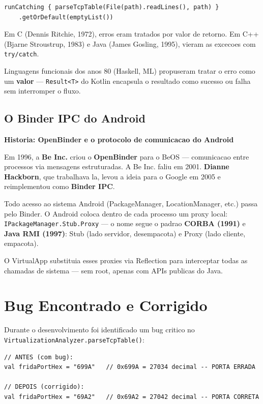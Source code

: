 \documentclass[12pt,a4paper]{article}
\begin{document}
\begin{lstlisting}
runCatching { parseTcpTable(File(path).readLines(), path) }
    .getOrDefault(emptyList())
\end{lstlisting}

Em C (Dennis Ritchie, 1972), erros eram tratados por valor de retorno.
Em C++ (Bjarne Stroustrup, 1983) e Java (James Gosling, 1995), vieram
as excecoes com \texttt{try/catch}.

Linguagens funcionais dos anos 80 (Haskell, ML) propuseram tratar o erro
como um \textbf{valor} --- \texttt{Result<T>} do Kotlin encapsula o resultado
como sucesso ou falha sem interromper o fluxo.

\subsection{O Binder IPC do Android}

\begin{historybox}
\textbf{Historia: OpenBinder e o protocolo de comunicacao do Android}

Em 1996, a \textbf{Be Inc.} criou o \textbf{OpenBinder} para o BeOS ---
comunicacao entre processos via mensagens estruturadas.
A Be Inc. faliu em 2001. \textbf{Dianne Hackborn}, que trabalhava la,
levou a ideia para o Google em 2005 e reimplementou como \textbf{Binder IPC}.

Todo acesso ao sistema Android (PackageManager, LocationManager, etc.)
passa pelo Binder. O Android coloca dentro de cada processo um proxy local:
\texttt{IPackageManager.Stub.Proxy} --- o nome segue o padrao \textbf{CORBA (1991)}
e \textbf{Java RMI (1997)}: Stub (lado servidor, desempacota) e Proxy
(lado cliente, empacota).

O VirtualApp substituia esses proxies via Reflection para interceptar
todas as chamadas de sistema --- sem root, apenas com APIs publicas do Java.
\end{historybox}

\newpage

\section{Bug Encontrado e Corrigido}

Durante o desenvolvimento foi identificado um bug critico no
\texttt{VirtualizationAnalyzer.parseTcpTable()}:

\begin{lstlisting}
// ANTES (com bug):
val fridaPortHex = "699A"   // 0x699A = 27034 decimal -- PORTA ERRADA

// DEPOIS (corrigido):
val fridaPortHex = "69A2"   // 0x69A2 = 27042 decimal -- PORTA CORRETA
\end{lstlisting}
\end{document}
